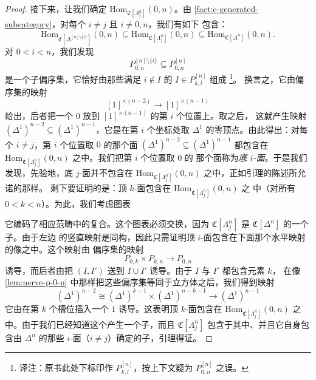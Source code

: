 \begin{proof}
接下来，让我们确定 $\mathrm{Hom}_{\mathfrak{C}[\Lambda^n_j]}(0, n)$。由%
\cref{fact:c-generated-subcategory}，对每个 $i \ne j$ 且 $i \ne 0, n$，我们有如下
包含：
\[
\mathrm{Hom}_{\mathfrak{C}[\Delta^{[n]\setminus\{i\}}]}(0, n) \subseteq
\mathrm{Hom}_{\mathfrak{C}[\Lambda^n_j]}(0, n) \subseteq
\mathrm{Hom}_{\mathfrak{C}[\Delta^n]}(0, n).
\]
对 $0 < i < n$，我们发现
\[
P^{[n]\setminus\{i\}}_{0,n} \subseteq P^{[n]}_{0,n}
\]
是一个子偏序集，它恰好由那些满足 $i \notin I$ 的 $I \in P^{[n]}_{k,l}$ 组成%
\footnote{译注：原书此处下标印作 $P^{[n]}_{k,l}$，按上下文疑为 $P^{[n]}_{0,n}$ 之误。}。
换言之，它由偏序集的映射
\[
[1]^{\times(n-2)} \to [1]^{\times(n-1)}
\]
给出，后者把一个 $0$ 放到 $[1]^{\times(n-1)}$ 的第 $i$ 个位置上。取\trNerve{}之后，
这就产生映射 $(\Delta^1)^{n-2} \subseteq (\Delta^1)^{n-1}$，它是在第 $i$ 个坐标处取
$\Delta^1$ 的零顶点。由此得出：对每个 $i \ne j$，第 $i$ 个位置取 $0$ 的那个面
$(\Delta^1)^{n-2} \subseteq (\Delta^1)^{n-1}$ 都包含在
$\mathrm{Hom}_{\mathfrak{C}[\Lambda^n_j]}(0, n)$ 之中。我们把第 $i$ 个位置取 $0$ 的
那个面称为\emph{底 $i$-面}。于是我们发现，先验地，底 $j$-面并不包含在
$\mathrm{Hom}_{\mathfrak{C}[\Lambda^n_j]}(0, n)$ 之中，正如引理的陈述所允诺的那样。
剩下要证明的是：顶 $k$-面包含在 $\mathrm{Hom}_{\mathfrak{C}[\Lambda^n_j]}(0, n)$ 之
中（对所有 $0 < k < n$）。为此，我们考虑图表
\begin{center}
\end{center}
它编码了相应范畴中的复合。这个图表必须交换，因为
$\mathfrak{C}[\Lambda^n_j]$ 是 $\mathfrak{C}[\Delta^n]$ 的一个子\trSimplicialCategory{}。由于左边
的竖直映射是同构，因此只需证明顶 $i$-面包含在下面那个水平映射的像之中。这个映射由
偏序集的映射
\[
P_{0,k} \times P_{k,n} \to P_{0,n}
\]
诱导，而后者由把 $(I, I')$ 送到 $I \cup I'$ 诱导。由于 $I$ 与 $I'$ 都包含元素 $k$，
在像\cref{lem:nerve-p-0-n} 中那样把这些偏序集等同于立方体之后，我们得到映射
\[
(\Delta^1)^{n-2} \cong (\Delta^1)^{k-1} \times (\Delta^1)^{n-k-1} \to
(\Delta^1)^{n-1}
\]
它由在第 $k$ 个槽位插入一个 $1$ 诱导。这表明顶 $k$-面包含在
$\mathrm{Hom}_{\mathfrak{C}[\Lambda^n_j]}(0, n)$ 之中。由于我们已经知道这个\trPuncturedCube{}产生一个子\trSimplicialCategory{}，而且 $\mathfrak{C}[\Lambda^n_j]$ 包含于其中、并且它自身包含由
$\Delta^n$ 的那些 $i$-面（$i \ne j$）确定的子\trSimplicialCategory{}，引理得证。
\end{proof}

